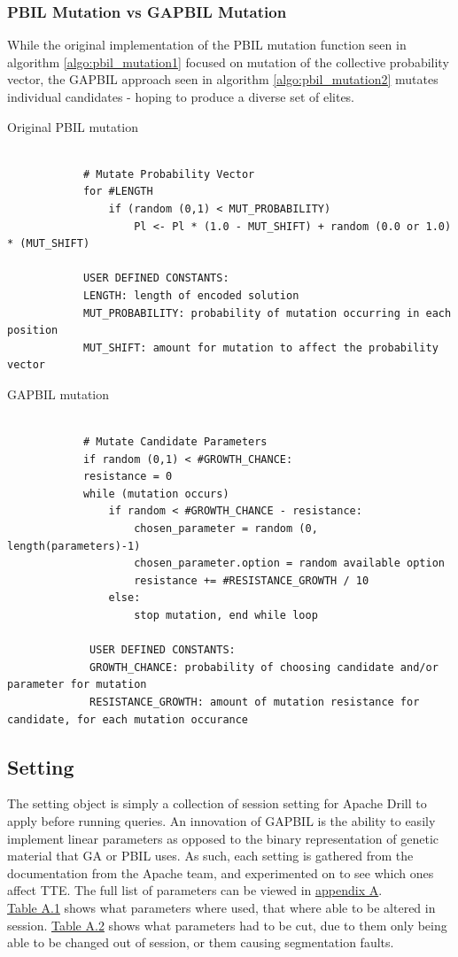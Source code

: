 \documentclass[a4paper,english]{report}
\begin{document}
		\subsubsection{PBIL Mutation vs GAPBIL Mutation}
		While the original implementation of the PBIL mutation function seen in algorithm \ref{algo:pbil_mutation1} focused on mutation of the collective probability vector, the GAPBIL approach seen in algorithm \ref{algo:pbil_mutation2} mutates individual candidates - hoping to produce a diverse set of elites.
		
		\begin{algorithm}
			\caption{Original PBIL mutation}\label{algo:pbil_mutation1}
		\scriptsize
			\begin{verbatim}
			
			# Mutate Probability Vector
			for #LENGTH
			    if (random (0,1) < MUT_PROBABILITY)
			        Pl <- Pl * (1.0 - MUT_SHIFT) + random (0.0 or 1.0) * (MUT_SHIFT)
				        
			USER DEFINED CONSTANTS:
			LENGTH: length of encoded solution
			MUT_PROBABILITY: probability of mutation occurring in each position
			MUT_SHIFT: amount for mutation to affect the probability vector

			\end{verbatim}
		\end{algorithm}
		\begin{algorithm}
		\caption{GAPBIL mutation}\label{algo:pbil_mutation2}
		\scriptsize
			\begin{verbatim}
			
			# Mutate Candidate Parameters
			if random (0,1) < #GROWTH_CHANCE:
			resistance = 0
			while (mutation occurs)
			    if random < #GROWTH_CHANCE - resistance:
			        chosen_parameter = random (0, length(parameters)-1)
			        chosen_parameter.option = random available option 
			        resistance += #RESISTANCE_GROWTH / 10
			    else:
			        stop mutation, end while loop
			        
			 USER DEFINED CONSTANTS:
			 GROWTH_CHANCE: probability of choosing candidate and/or parameter for mutation
			 RESISTANCE_GROWTH: amount of mutation resistance for candidate, for each mutation occurance
		\end{verbatim}
		\end{algorithm}
		\subsection{Setting}
		The setting object is simply a collection of session setting for Apache Drill to apply before running queries. An innovation of GAPBIL is the ability to easily implement linear parameters as opposed to the binary representation of genetic material that GA or PBIL uses. As such, each setting is gathered from the documentation from the Apache team, and experimented on to see which ones affect TTE. The full list of parameters can be viewed in \hyperref[system_params]{appendix A}. \\ \hyperref[table:added_params]{Table A.1} shows what parameters where used, that where able to be altered in session. \hyperref[table:removed_params]{Table A.2} shows what parameters had to be cut, due to them only being able to be changed out of session, or them causing segmentation faults. 
\end{document}

